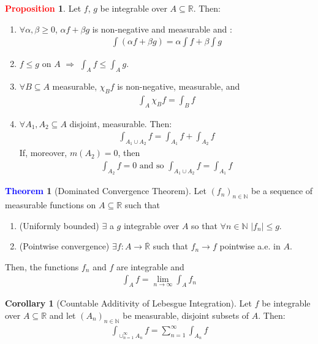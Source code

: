 \documentclass[11pt]{article}
\theoremstyle{definition}
\newcommand{\bb}[1]{\mathbb{#1}}
\newtheorem{theorem}{\textcolor{blue}{Theorem}}
\newtheorem{corollary}{Corollary}
\theoremstyle{definition}
\newtheorem{prop}{\textcolor{red}{Proposition}}
\theoremstyle{remark}
\begin{document}
\begin{prop} Let $f$, $g$ be integrable over $A \subseteq \bb{R}$. Then: 
\begin{enumerate}[noitemsep]
	\item $\forall \alpha, \beta \geq 0$, $\alpha f + \beta g$ is non-negative and measurable and :
	\begin{align*}
		\int (\alpha f + \beta g) = \alpha \int f + \beta \int g 	
	\end{align*}
	\item $f \leq g$ on $A$ $\Rightarrow$ $\int_A f \leq \int_A g$. 
	\item $\forall B \subseteq A$ measurable, $\chi_B f$ is non-negative, measurable, and 
	\begin{align*}
		\int_A \chi_B f = \int_B f 	
	\end{align*}
	\item $\forall A_1, A_2 \subseteq A$ disjoint, measurable. Then: 
	\begin{align*}
		\int_{A_1 \cup A_2} f = \int_{A_1} f + \int_{A_2} f 	
	\end{align*}
	If, moreover, $m(A_2) = 0$, then
	\begin{align*}
		\int_{A_2} f = 0 \mbox{ and so } \int_{A_1 \cup A_2}f = \int_{A_1} f	
	\end{align*}
\end{enumerate}
\end{prop}

\begin{theorem}[Dominated Convergence Theorem]
	Let $(f_n)_{n \in \bb{N}}$ be a sequence of measurable functions on $A \subseteq \bb{R}$ such that 
	\begin{enumerate}[noitemsep]
		\item (Uniformly bounded) $\exists$ a $g$ integrable over $A$ so that $\forall n \in \bb{N}$ $|f_n| \leq g$. 
		\item (Pointwise convergence) $\exists f: A \rightarrow \overline{\bb{R}}$ such that $f_n \rightarrow f$ pointwise a.e. in $A$. 
	\end{enumerate}
	Then, the functions $f_n$ and $f$ are integrable and
	\begin{align*}
		\int_A f = \lim_{n \rightarrow \infty} \int_A f_n 	
	\end{align*}
\end{theorem}

\begin{corollary}[Countable Additivity of Lebesgue Integration]
	Let $f$ be integrable over $A \subseteq \bb{R}$ and let $(A_n)_{n \in \bb{N}}$ be measurable, disjoint subsets of $A$. Then: 
	\begin{align}
		\int_{\cup_{n=1}^\infty A_n} f = \sum_{n =1}^\infty \int_{A_n} f  
	\end{align}
\end{corollary}
\end{document}
